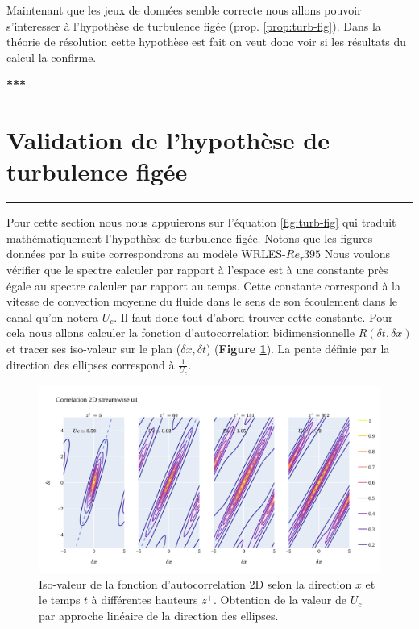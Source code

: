 \documentclass[12pt]{article}
\theoremstyle{plain}
\theoremstyle{remark}
\begin{document}
\pagebreak

Maintenant que les jeux de données semble correcte nous allons pouvoir s'interesser à l'hypothèse de turbulence figée (prop. \ref{prop:turb-fig}). Dans la théorie de résolution cette hypothèse est fait on veut donc voir si les résultats du calcul la confirme. 


\begin{center}
	\large {\bf{***}}
\end{center}

\vspace{0.3cm}
\section{Validation de l'hypothèse de turbulence figée}
\noindent\rule{\linewidth}{2pt}
\vspace{0.1cm}

Pour cette section nous nous appuierons sur l'équation \ref{fig:turb-fig} qui traduit mathématiquement l'hypothèse de turbulence figée. Notons que les figures données par la suite correspondrons au modèle WRLES-$Re_{\tau}395$  Nous voulons vérifier que le spectre calculer par rapport à l'espace est à une constante près égale au spectre calculer par rapport au temps. Cette constante correspond à la vitesse de convection moyenne du fluide dans le sens de son écoulement dans le canal qu'on notera $U_c$. Il faut donc tout d'abord trouver cette constante. Pour cela nous allons calculer la fonction d'autocorrelation bidimensionnelle $R(\delta t, \delta x)$ et tracer ses iso-valeur sur le plan ($\delta x, \delta t$) ({\bf Figure \ref{fig:corr-2d}}). La pente définie par la direction des ellipses correspond à $\frac{1}{U_c}$.

\begin{figure}[h!]
	\begin{center}
		\includegraphics[width=0.9\linewidth]{../../output/figures/channel_wrles_retau395/split_time/frozen_turbulence/correlation2D/u1.png}
		\caption{Iso-valeur de la fonction d'autocorrelation 2D selon la direction $x$ et le temps $t$ à différentes hauteurs $z^+$. Obtention de la valeur de $U_c$ par approche linéaire de la direction des ellipses.}
		\label{fig:corr-2d}
	\end{center}
\end{figure}
\end{document}
